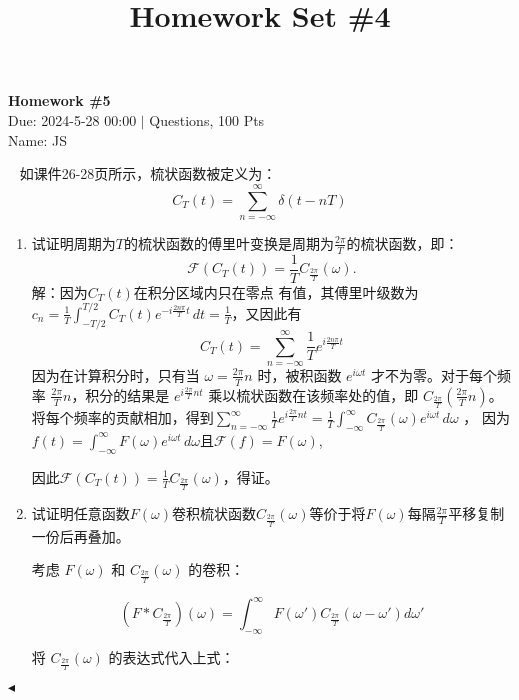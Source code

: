 \documentclass[11pt]{article}
\title{Homework Set \#4}
\newenvironment{question}[2][Question]{\begin{trivlist}
\item[\hskip \labelsep {\bfseries #1}\hskip \labelsep {\bfseries #2.}]}{\hfill$\blacktriangleleft$\end{trivlist}}
\begin{document}
    \pagestyle{fancy}
    \lhead{}
    \chead{}

    \begin{center}
        {\LARGE \bf Homework \#5}\\
        {Due: 2024-5-28 00:00 \quad$|$ Questions, 100 Pts}\\
        {Name: JS}
    \end{center}

    \begin{question}{1 (100') (梳状函数)}~
    如课件26-28页所示，梳状函数被定义为：
    \begin{equation*}
        C_T(t) = \sum_{n=-\infty}^{\infty}\delta(t-nT)
    \end{equation*}
    \begin{enumerate}
        \item 试证明周期为$T$的梳状函数的傅里叶变换是周期为$\frac{2\pi}{T}$的梳状函数，即：
    \begin{equation*}
        \mathcal{F}(C_T(t)) = \frac{1}{T}C_{\frac{2\pi}{T}}(\omega).
    \end{equation*}
    解：因为$C_T(t)$在积分区域内只在零点
    有值，其傅里叶级数为$c_n = \frac{1}{T}\int_{-T/2}^{T/2} C_T(t)e^{-i \frac{2n \pi}{T}t}  \,dt = \frac{1}{T} $，又因此有
    \[C_T(t) = \sum_{n = -\infty}^{\infty}\frac{1}{T} e^{i \frac{2n \pi}{T}t}  \]
    因为在计算积分时，只有当 \(\omega = \frac{2\pi}{T}n\) 时，被积函数 \(e^{i\omega t}\) 才不为零。对于每个频率 \(\frac{2\pi}{T}n\)，积分的结果是 \(e^{i\frac{2\pi}{T}n t}\) 乘以梳状函数在该频率处的值，即 \(C_{\frac{2\pi}{T}}\left(\frac{2\pi}{T}n\right)\)。
    将每个频率的贡献相加，得到$\sum_{n = -\infty}^{\infty}\frac{1}{T} e^{i \frac{2\pi}{T}n t} = \frac{1}{T} \int_{-\infty}^{\infty} C_{\frac{2 \pi}{T}}(\omega)e^{i \omega t} \,d\omega$ ，
    因为$f(t) = \int_{-\infty}^{\infty} F(\omega) e^{i\omega t} \,d\omega$且$\mathcal{F}(f) = F(\omega) $,

    因此$\mathcal{F}(C_T(t))= \frac{1}{T} C_{\frac{2 \pi}{T}}(\omega)$，得证。
    \item 试证明任意函数$F(\omega)$卷积梳状函数$C_{\frac{2\pi}{T}}(\omega)$等价于将$F(\omega)$每隔$\frac{2\pi}{T}$平移复制一份后再叠加。
    
    考虑 \( F(\omega) \) 和 \( C_{\frac{2\pi}{T}}(\omega) \) 的卷积：

    \[ (F * C_{\frac{2\pi}{T}})(\omega) = \int_{-\infty}^{\infty} F(\omega') C_{\frac{2\pi}{T}}(\omega - \omega') d\omega' \]

    将 \( C_{\frac{2\pi}{T}}(\omega) \) 的表达式代入上式：


\end{enumerate}
\end{question}
\end{document}
